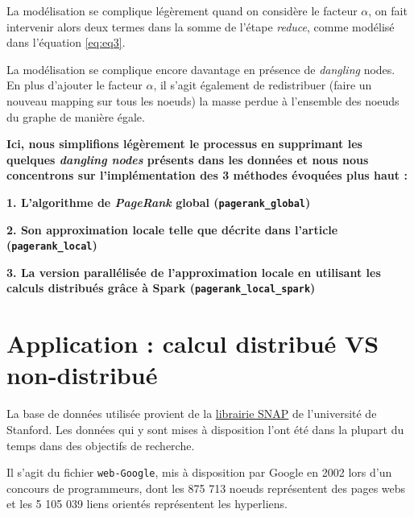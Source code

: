\documentclass[10pt,a4paper]{article}
\newenvironment{Shaded}{\begin{snugshade}}{\end{snugshade}}
\newcommand{\CommentTok}[1]{\textcolor[rgb]{0.56,0.35,0.01}{\textit{#1}}}
\newcommand{\ImportTok}[1]{#1}
\newcommand{\NormalTok}[1]{#1}
\newcommand{\OperatorTok}[1]{\textcolor[rgb]{0.81,0.36,0.00}{\textbf{#1}}}
\theoremstyle{break}
\begin{document}
La modélisation se complique légèrement quand on considère le facteur \(\alpha\), on fait intervenir alors deux termes dans la somme de l'étape \emph{reduce}, comme modélisé dans l'équation \ref{eq:eq3}.

La modélisation se complique encore davantage en présence de \emph{dangling} nodes. En plus d'ajouter le facteur \(\alpha\), il s'agit également de redistribuer (faire un nouveau mapping sur tous les noeuds) la masse perdue à l'ensemble des noeuds du graphe de manière égale.

\textbf{\faArrowCircleRight{} Ici, nous simplifions légèrement le processus en supprimant les quelques \emph{dangling nodes} présents dans les données et nous nous concentrons sur l'implémentation des 3 méthodes évoquées plus haut :}

\textbf{1. L'algorithme de \emph{PageRank} global (\texttt{pagerank\_global})}

\textbf{2. Son approximation locale telle que décrite dans l'article \cite{Chen} (\texttt{pagerank\_local})}

\textbf{3. La version parallélisée de l'approximation locale en utilisant les calculs distribués grâce à Spark (\texttt{pagerank\_local\_spark})}

\hypertarget{application-calcul-distribuuxe9-vs-non-distribuuxe9}{%
\section{Application : calcul distribué VS non-distribué}\label{application-calcul-distribuuxe9-vs-non-distribuuxe9}}

La base de données utilisée provient de la \href{http://snap.stanford.edu/data/index.html}{librairie SNAP} de l'université de Stanford. Les données qui y sont mises à disposition l'ont été dans la plupart du temps dans des objectifs de recherche.

Il s'agit du fichier \texttt{web-Google}, mis à disposition par Google en 2002 lors d'un concours de programmeurs, dont les 875 713 noeuds représentent des pages webs et les 5 105 039 liens orientés représentent les hyperliens.

\begin{Shaded}
\end{Shaded}
\end{document}
